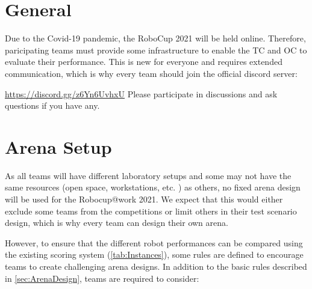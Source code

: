 
\section{General} 
\label{sec:VRCGeneral}

Due to the Covid-19 pandemic, the RoboCup 2021 will be held online. 
Therefore, paricipating teams must provide some infrastructure to enable the TC and OC to evaluate their performance.
This is new for everyone and requires extended communication, which is why every team should join the official discord server:

\href{Official Discort Server}{https://discord.gg/z6Yn6UvhxU}
Please participate in discussions and ask questions if you have any.

\section{Arena Setup} 
\label{sec:VRCArenaSetup}

As all teams will have different laboratory setups and some may not have the same resources (open space, workstations, etc. ) as others, no fixed arena design will be used for the Robocup@work 2021. We expect that this would either exclude some teams from the competitions or limit others in their test scenario design, which is why every team can design their own arena.

However, to ensure that the different robot performances can be compared using the existing scoring system (\ref{tab:Instances}), some rules are defined to encourage teams to create challenging arena designs. In addition to the basic rules described in \ref{sec:ArenaDesign}, teams are required to consider: 
  
